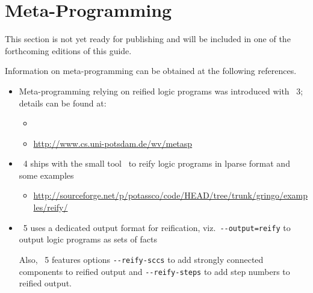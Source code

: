\section{Meta-Programming}\label{sec:meta}

This section is not yet ready for publishing
and will be included in one of the forthcoming editions of this guide.

Information on meta-programming can be obtained at the following references.

\begin{itemize}
\item Meta-programming relying on reified logic programs was introduced with \gringo~3;
  details can be found at:
  \begin{itemize}
  \item \cite{gekasc11b}
  \item \url{http://www.cs.uni-potsdam.de/wv/metasp}
  \end{itemize}

\item \gringo~4 ships with the small tool \reify\ to reify logic programs in lparse format and some examples
  \begin{itemize}
    \item \url{http://sourceforge.net/p/potassco/code/HEAD/tree/trunk/gringo/examples/reify/}
  \end{itemize}

\item \gringo~5 uses a dedicated output format for reification, viz.\
  \lstinline{--output=reify}
  to output logic programs as sets of facts

  Also, \gringo~5 features options
  \lstinline{--reify-sccs}
  to add strongly connected components to reified output
  and
  \lstinline{--reify-steps}
  to add step numbers to reified output.
\com{T2R: reify tool?}
\end{itemize}

% 

